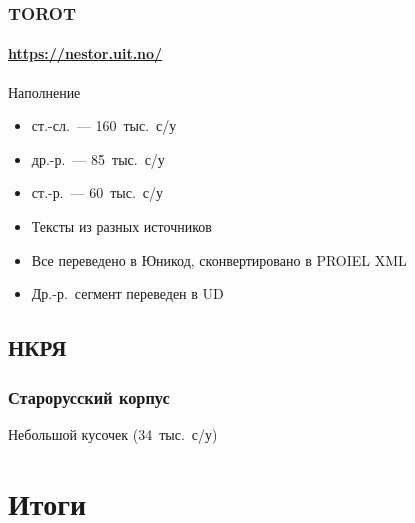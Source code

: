 \begin{frame}
  \frametitle{TOROT}
  \framesubtitle{\url{https://nestor.uit.no/}}

  \begin{block}{Наполнение}
    \begin{itemize}
      \item ст.-сл.~--- 160~тыс.\ с/у
      \item др.-р.~--- 85~тыс.\ с/у
      \item ст.-р.~--- 60~тыс.\ с/у
    \end{itemize}
  \end{block}

  \vfill

  \begin{itemize}
    \item Тексты из разных источников
    \item Все переведено в Юникод, сконвертировано в PROIEL XML
    \item Др.-р.\ сегмент переведен в UD
  \end{itemize}

\end{frame}

\subsection{НКРЯ}

\begin{frame}
  \frametitle{Старорусский корпус}

  \centering
  Небольшой кусочек (34~тыс.\ с/у)

\end{frame}

\section{Итоги}
\frame{\tableofcontents[currentsection]}

